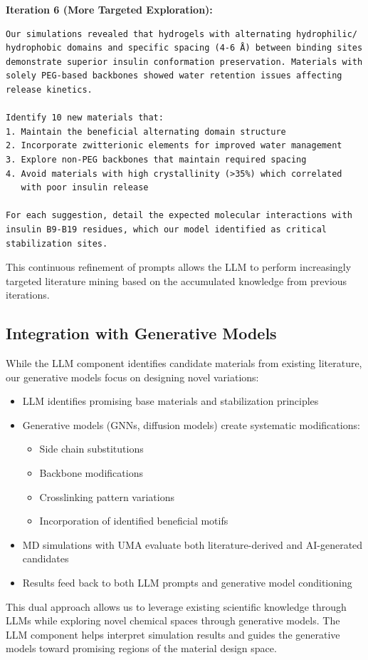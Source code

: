 \documentclass[11pt,a4paper]{article}
\begin{document}
\textbf{Iteration 6 (More Targeted Exploration):}
\begin{lstlisting}
Our simulations revealed that hydrogels with alternating hydrophilic/
hydrophobic domains and specific spacing (4-6 Å) between binding sites 
demonstrate superior insulin conformation preservation. Materials with 
solely PEG-based backbones showed water retention issues affecting 
release kinetics.

Identify 10 new materials that:
1. Maintain the beneficial alternating domain structure
2. Incorporate zwitterionic elements for improved water management
3. Explore non-PEG backbones that maintain required spacing
4. Avoid materials with high crystallinity (>35%) which correlated 
   with poor insulin release

For each suggestion, detail the expected molecular interactions with 
insulin B9-B19 residues, which our model identified as critical 
stabilization sites.
\end{lstlisting}

This continuous refinement of prompts allows the LLM to perform increasingly targeted literature mining based on the accumulated knowledge from previous iterations.

\subsection{Integration with Generative Models}

While the LLM component identifies candidate materials from existing literature, our generative models focus on designing novel variations:

\begin{itemize}
    \item LLM identifies promising base materials and stabilization principles
    \item Generative models (GNNs, diffusion models) create systematic modifications:
    \begin{itemize}
        \item Side chain substitutions
        \item Backbone modifications
        \item Crosslinking pattern variations
        \item Incorporation of identified beneficial motifs
    \end{itemize}
    \item MD simulations with UMA evaluate both literature-derived and AI-generated candidates
    \item Results feed back to both LLM prompts and generative model conditioning
\end{itemize}

This dual approach allows us to leverage existing scientific knowledge through LLMs while exploring novel chemical spaces through generative models. The LLM component helps interpret simulation results and guides the generative models toward promising regions of the material design space.
\end{document}
